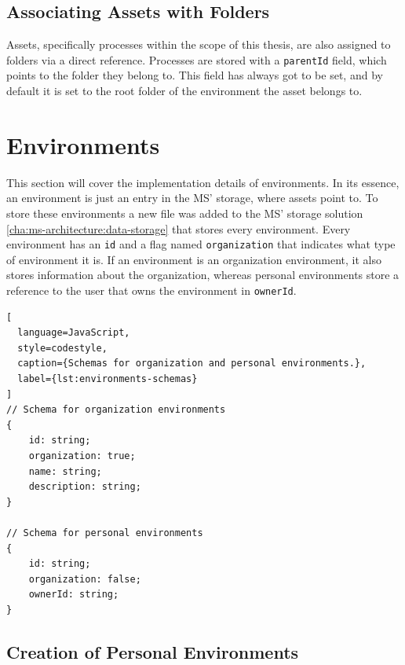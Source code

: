 \subsection{Associating Assets with Folders}

Assets, specifically processes within the scope of this thesis,
are also assigned to folders via a direct reference.
Processes are stored with a \lstinline{parentId} field,
which points to the folder they belong to.
This field has always got to be set, and by default it is set to the root folder of the
environment the asset belongs to.

\section{Environments}


This section will cover the implementation details of environments.
In its essence, an environment is just an entry in the MS' storage, where assets point to.
To store these environments a new file was added to the MS' storage solution
\ref{cha:ms-architecture:data-storage} that stores every environment.
Every environment has an \lstinline{id} and a flag named \lstinline{organization} that
indicates what type of environment it is.
If an environment is an organization environment, it also stores information about the
organization,
whereas personal environments store a reference to the user that owns the environment in
\lstinline{ownerId}.

\begin{lstlisting}[
  language=JavaScript,
  style=codestyle,
  caption={Schemas for organization and personal environments.},
  label={lst:environments-schemas}
]
// Schema for organization environments
{
    id: string;
    organization: true;
    name: string;
    description: string;
}

// Schema for personal environments
{
    id: string;
    organization: false;
    ownerId: string;
}
\end{lstlisting}

\subsection{Creation of Personal Environments}

